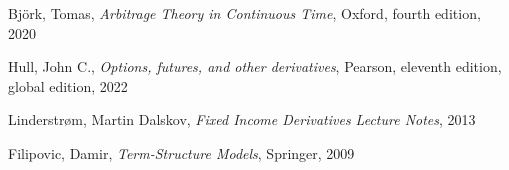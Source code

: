 \clearpage
{}

\begin{thebibliography}{25}
Björk, Tomas,
\emph{Arbitrage Theory in Continuous Time},
 Oxford, fourth edition, 2020

Hull, John C., 
\emph{Options, futures, and other derivatives},
Pearson, eleventh edition, global edition, 2022

Linderstrøm, Martin Dalskov, 
\emph{Fixed Income Derivatives Lecture Notes},
2013

Filipovic, Damir, \emph{Term-Structure Models}, 
Springer, 2009

\end{thebibliography}

